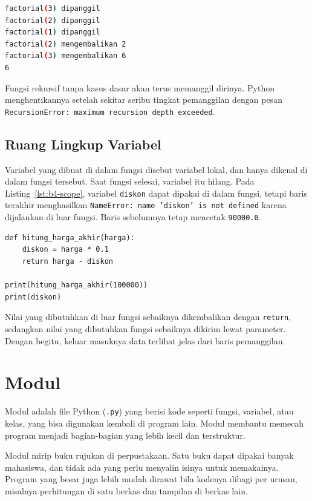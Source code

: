 \begin{lstlisting}[language=bash, caption={Keluaran recursive_trace.py}, label={lst:b4-recursive-trace-out}]
factorial(3) dipanggil
factorial(2) dipanggil
factorial(1) dipanggil
factorial(2) mengembalikan 2
factorial(3) mengembalikan 6
6
\end{lstlisting}

Fungsi rekursif tanpa kasus dasar akan terus memanggil dirinya. Python menghentikannya setelah sekitar seribu tingkat pemanggilan dengan pesan \texttt{RecursionError: maximum recursion depth exceeded}.

\subsection{Ruang Lingkup Variabel}
Variabel yang dibuat di dalam fungsi disebut variabel lokal, dan hanya dikenal di dalam fungsi tersebut. Saat fungsi selesai, variabel itu hilang. Pada Listing~\ref{lst:b4-scope}, variabel \texttt{diskon} dapat dipakai di dalam fungsi, tetapi baris terakhir menghasilkan \texttt{NameError: name 'diskon' is not defined} karena dijalankan di luar fungsi. Baris sebelumnya tetap mencetak \texttt{90000.0}.

\begin{lstlisting}[style=PythonStyle, caption={Kode Python: variabel_lokal.py}, label={lst:b4-scope}]
def hitung_harga_akhir(harga):
    diskon = harga * 0.1
    return harga - diskon

print(hitung_harga_akhir(100000))
print(diskon)
\end{lstlisting}

Nilai yang dibutuhkan di luar fungsi sebaiknya dikembalikan dengan \texttt{return}, sedangkan nilai yang dibutuhkan fungsi sebaiknya dikirim lewat parameter. Dengan begitu, keluar masuknya data terlihat jelas dari baris pemanggilan.

\section{Modul}

Modul adalah file Python (\texttt{.py}) yang berisi kode seperti fungsi, variabel, atau kelas, yang bisa digunakan kembali di program lain. Modul membantu memecah program menjadi bagian-bagian yang lebih kecil dan terstruktur.

Modul mirip buku rujukan di perpustakaan. Satu buku dapat dipakai banyak mahasiswa, dan tidak ada yang perlu menyalin isinya untuk memakainya. Program yang besar juga lebih mudah dirawat bila kodenya dibagi per urusan, misalnya perhitungan di satu berkas dan tampilan di berkas lain.

